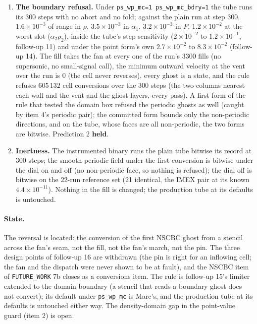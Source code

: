 \documentclass[11pt,a4paper]{article}
\newcommand{\code}[1]{\texttt{\small #1}}
\begin{document}
\begin{enumerate}[nosep]
      (\code{REY2PTS\_phase\_try}) accepted it: the branch solve
      brackets the energy in temperature at the given density and does
      not test the density against $[\rho_{\min}, \rho_{\max}]$, the
      domain the fill's own clamp uses.  A point value beyond the pole
      is not a state, and the guard did not say so.  Not changed here;
      recorded in \code{FUTURE\_WORK} as a one-line fix for rule 2
      (refuse at creation) that Marc may want before the conversions
      are used anywhere, boundary or not.
\item \textbf{The boundary refusal.}  Under \code{ps\_wp\_mc=1
      ps\_wp\_mc\_bdry=1} the tube runs its 300 steps with no abort and
      no fold; against the plain run at step 300, $1.6\times10^{-3}$ of
      range in $\rho$, $3.5\times10^{-3}$ in $\alpha_1$,
      $3.2\times10^{-3}$ in $P$, $1.2\times10^{-2}$ at the worst slot
      ($\alpha_2\rho_2$), inside the tube's step sensitivity
      ($2\times10^{-2}$ to $1.2\times10^{-1}$, follow-up 11) and under
      the point form's own $2.7\times10^{-2}$ to $8.3\times10^{-2}$
      (follow-up 14).  The fill takes the fan at every one of the run's 3300 fills (no supersonic, no small-signal call), the minimum outward velocity at the vent over the run is $0$ (the cell never reverses), every ghost is a state, and the rule refuses $605\,132$ cell conversions over the 300 steps (the two columns nearest each wall and the vent and the ghost layers, every pass).  A first form of the rule that tested the domain box refused the periodic ghosts as well (caught by item 4's periodic pair); the committed form bounds only the non-periodic directions, and on the tube, whose faces are all non-periodic, the two forms are bitwise.  Prediction 2 \textbf{held}.
\item \textbf{Inertness.}  The instrumented binary runs the plain tube
      bitwise its record at 300 steps; the smooth periodic field under
      the first conversion is bitwise under the dial on and off (no
      non-periodic face, so nothing is refused); the dial off is bitwise on the 22-run reference set (21 identical, the IMEX pair at its known $4.4\times10^{-11}$).  Nothing in the fill is changed; the production tube at its defaults is untouched.
\end{enumerate}

\paragraph{State.}  The reversal is located: the conversion of the
first NSCBC ghost from a stencil across the fan's seam, not the fill,
not the fan's march, not the pin.  The three design points of
follow-up 16 are withdrawn (the pin is right for an inflowing cell; the
fan and the dispatch were never shown to be at fault), and the NSCBC
item of \code{FUTURE\_WORK} 7b closes as a conversions item.  The rule
is follow-up 15's limiter extended to the domain boundary (a stencil
that reads a boundary ghost does not convert); its default under
\code{ps\_wp\_mc} is Marc's, and the production tube at its defaults is
untouched either way.  The density-domain gap in the point-value guard
(item 2) is open.
\end{document}
